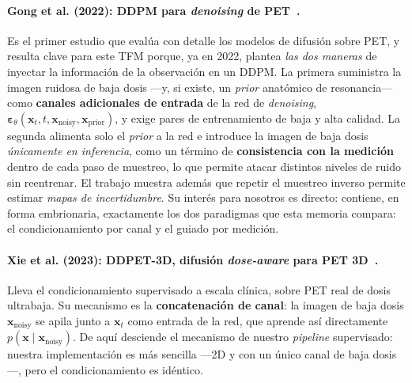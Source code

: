 \paragraph{Gong et al. (2022): DDPM para \textit{denoising} de
PET~\cite{ddpmpet2023}.} Es el primer estudio que evalúa con detalle
los modelos de difusión sobre PET, y resulta clave para este TFM
porque, ya en 2022, plantea \emph{las dos maneras} de inyectar la
información de la observación en un DDPM. La primera suministra la
imagen ruidosa de baja dosis —y, si existe, un \textit{prior}
anatómico de resonancia— como \textbf{canales adicionales de entrada}
de la red de \textit{denoising},
$\boldsymbol{\varepsilon}_\theta(\mathbf{x}_t, t,
\mathbf{x}_{\text{noisy}}, \mathbf{x}_{\text{prior}})$, y exige pares
de entrenamiento de baja y alta calidad. La segunda alimenta solo el
\textit{prior} a la red e introduce la imagen de baja dosis
\emph{únicamente en inferencia}, como un término de
\textbf{consistencia con la medición} dentro de cada paso de muestreo,
lo que permite atacar distintos niveles de ruido sin reentrenar. El
trabajo muestra además que repetir el muestreo inverso permite estimar
\emph{mapas de incertidumbre}. Su interés para nosotros es directo:
contiene, en forma embrionaria, exactamente los dos paradigmas que
esta memoria compara: el condicionamiento por canal y el guiado por
medición.

\paragraph{Xie et al. (2023): DDPET-3D, difusión \textit{dose-aware}
para PET 3D~\cite{ddpet3d}.} Lleva el condicionamiento supervisado a
escala clínica, sobre PET real de dosis ultrabaja. Su mecanismo es la
\textbf{concatenación de canal}: la imagen de baja dosis
$\mathbf{x}_{\text{noisy}}$ se apila junto a $\mathbf{x}_t$ como entrada
de la red, que aprende así directamente
$p(\mathbf{x}\mid\mathbf{x}_{\text{noisy}})$. De aquí desciende el
mecanismo de nuestro \textit{pipeline} supervisado: nuestra
implementación es más sencilla —2D y con un único canal de baja
dosis—, pero el condicionamiento es idéntico.

